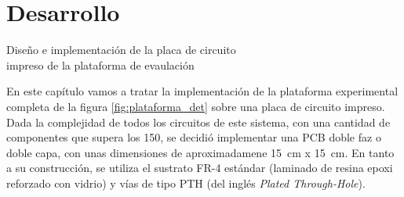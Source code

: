 \section{Desarrollo} \label{desarrollo}
\thispagestyle{plain}

\vspace{0.5cm}

\Large\scshape
\begin{center}
    {\Medium Diseño e implementación de la placa de circuito \\impreso de la plataforma de evaulación}
\end{center}
\normalfont

\divider

En este capítulo vamos a tratar la implementación de la plataforma experimental completa de la figura \ref{fig:plataforma_det} sobre una placa de circuito impreso. Dada la complejidad de todos los circuitos de este sistema, con una cantidad de componentes que supera los 150, se decidió  implementar una PCB doble faz o doble capa, con unas dimensiones de aproximadamene \SI[]{15}[]{\centi\metre} x \SI[]{15}[]{\centi\metre}. En tanto a su construcción, se utiliza el sustrato FR-4 estándar (laminado de resina epoxi reforzado con vidrio) y vías de tipo PTH (del inglés \textit{Plated Through-Hole}).\\

